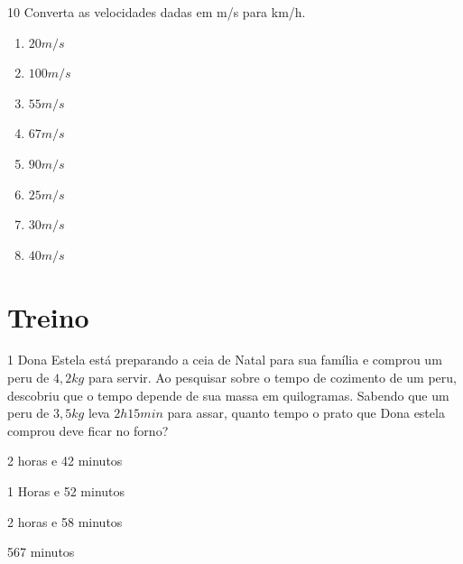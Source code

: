 {{\num{10} Converta as velocidades dadas em m/s para km/h.

\begin{multicols}{3}
\begin{enumerate}[itemsep=-3pt]
\item $20 m/s$
\item $100 m/s$
\item $55 m/s$
\item $67 m/s$
\item $90 m/s$
\item $25 m/s$
\item $30 m/s$
\item $40 m/s$
\end{enumerate}
\end{multicols}


\section*{Treino}

\num{1} Dona Estela está preparando a ceia de Natal para sua família e
comprou um peru de $4,2 kg$ para servir. Ao pesquisar sobre o tempo de
cozimento de um peru, descobriu que o tempo depende de sua massa em
quilogramas. Sabendo que um peru de $3,5 kg$ leva $2h15min$ para assar,
quanto tempo o prato que Dona estela comprou deve ficar no forno?

\begin{escolha}%
\item 2 horas e 42 minutos
\item 1 Horas e 52 minutos
\item 2 horas e 58 minutos
\item 567 minutos
\end{escolha}



}}
